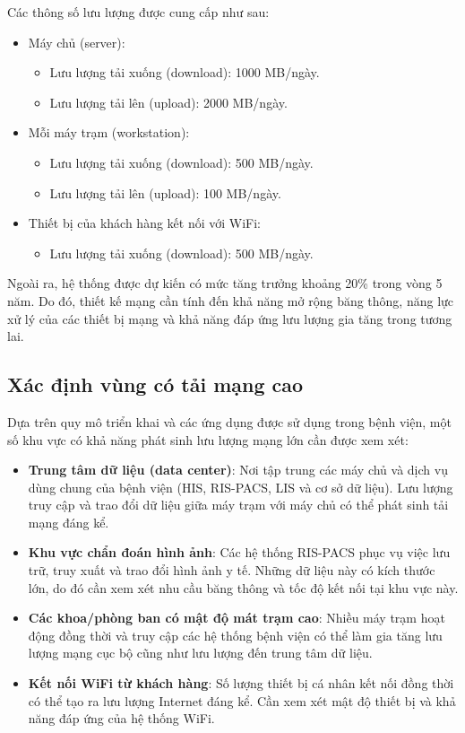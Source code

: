 Các thông số lưu lượng được cung cấp như sau:
\begin{itemize}
    \item Máy chủ (server):
    \begin{itemize}
        \item Lưu lượng tải xuống (download): 1000 MB/ngày.
        \item Lưu lượng tải lên (upload): 2000 MB/ngày.
    \end{itemize}

    \item Mỗi máy trạm (workstation):
    \begin{itemize}
        \item Lưu lượng tải xuống (download): 500 MB/ngày.
        \item Lưu lượng tải lên (upload): 100 MB/ngày.
    \end{itemize}
    
    \item Thiết bị của khách hàng kết nối với WiFi:
    \begin{itemize}
        \item Lưu lượng tải xuống (download): 500 MB/ngày.
    \end{itemize}
\end{itemize}

Ngoài ra, hệ thống được dự kiến có mức tăng trưởng khoảng 20\% trong vòng 5 năm. Do đó, thiết kế mạng cần tính đến khả năng mở rộng băng thông, năng lực xử lý của các thiết bị mạng và khả năng đáp ứng lưu lượng gia tăng trong tương lai.

\subsection{Xác định vùng có tải mạng cao}
Dựa trên quy mô triển khai và các ứng dụng được sử dụng trong bệnh viện, một số khu vực có khả năng phát sinh lưu lượng mạng lớn cần được xem xét:

\begin{itemize}
    \item \textbf{Trung tâm dữ liệu (data center)}: Nơi tập trung các máy chủ và dịch vụ dùng chung của bệnh viện (HIS, RIS-PACS, LIS và cơ sở dữ liệu). Lưu lượng truy cập và trao đổi dữ liệu giữa máy trạm với máy chủ có thể phát sinh tải mạng đáng kể.
    \item \textbf{Khu vực chẩn đoán hình ảnh}: Các hệ thống RIS-PACS phục vụ việc lưu trữ, truy xuất và trao đổi hình ảnh y tế. Những dữ liệu này có kích thước lớn, do đó cần xem xét nhu cầu băng thông và tốc độ kết nối tại khu vực này.
    \item \textbf{Các khoa/phòng ban có mật độ mát trạm cao}: Nhiều máy trạm hoạt động đồng thời và truy cập các hệ thống bệnh viện có thể làm gia tăng lưu lượng mạng cục bộ cũng như lưu lượng đến trung tâm dữ liệu.
    \item \textbf{Kết nối WiFi từ khách hàng}: Số lượng thiết bị cá nhân kết nối đồng thời có thể tạo ra lưu lượng Internet đáng kể. Cần xem xét mật độ thiết bị và khả năng đáp ứng của hệ thống WiFi.
\end{itemize}


